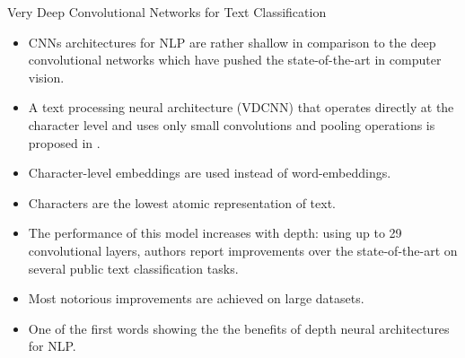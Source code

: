 \documentclass[handout]{beamer}
\begin{document}
\begin{frame}{Very Deep Convolutional Networks for Text Classification}
\begin{scriptsize}
\begin{itemize}
\item CNNs architectures for NLP are rather shallow in comparison to the deep convolutional networks which have pushed the state-of-the-art in computer vision.
\item A text processing neural architecture (VDCNN) that operates directly at the character level and uses only small convolutions and pooling operations is proposed in \cite{conneau2017very}.

\item Character-level embeddings are used instead of word-embeddings.

\item Characters are the lowest atomic representation of text. 

\item The performance of this model increases with depth: using up to 29 convolutional layers, authors report improvements over the state-of-the-art on several public text classification tasks. 

\item Most notorious improvements are achieved on large datasets.

\item One of the first words showing the the benefits of  depth neural architectures for NLP.
\end{itemize}
\end{scriptsize}
\end{frame}
\end{document}
